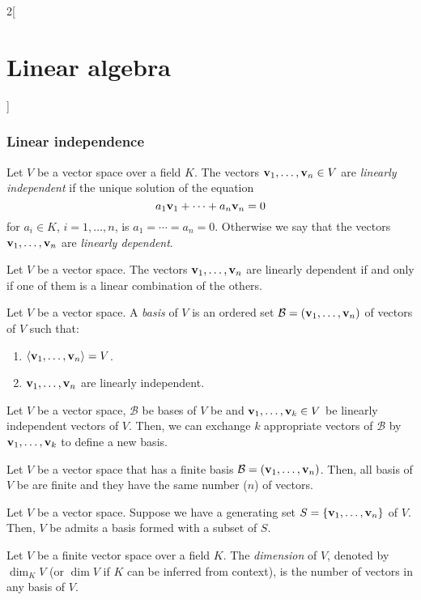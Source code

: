 \documentclass[../../../main_math.tex]{subfiles}
\begin{document}
\begin{multicols}{2}[\section{Linear algebra}]
  \subsubsection{Linear independence}
  \begin{definition}
    Let $V$ be a vector space over a field $K$. The vectors $\boldsymbol{\mathrm{v}}_1,\ldots,\boldsymbol{\mathrm{v}}_n\in V$ are \emph{linearly independent} if the unique solution of the equation $$a_1\boldsymbol{\mathrm{v}}_1+\cdots+a_n\boldsymbol{\mathrm{v}}_n=0$$ for $a_i\in K$, $i=1,\ldots,n$, is $a_1=\cdots=a_n=0$. Otherwise we say that the vectors $\boldsymbol{\mathrm{v}}_1,\ldots,\boldsymbol{\mathrm{v}}_n$ are \emph{linearly dependent}.
  \end{definition}
  \begin{lemma}
    Let $V$ be a vector space. The vectors $\boldsymbol{\mathrm{v}}_1,\ldots,\boldsymbol{\mathrm{v}}_n$ are linearly dependent if and only if one of them is a linear combination of the others.
  \end{lemma}
  \begin{definition}
    Let $V$ be a vector space. A \emph{basis} of $V$ is an ordered set $\mathcal{B}=(\boldsymbol{\mathrm{v}}_1,\ldots,\boldsymbol{\mathrm{v}}_n)$ of vectors of $V$ such that:
    \begin{enumerate}
      \item $\langle \boldsymbol{\mathrm{v}}_1,\ldots,\boldsymbol{\mathrm{v}}_n\rangle = V$.
      \item $\boldsymbol{\mathrm{v}}_1,\ldots,\boldsymbol{\mathrm{v}}_n$ are linearly independent.
    \end{enumerate}
  \end{definition}
  \begin{lemma}
    Let $V$ be a vector space, $\mathcal{B}$ be bases of $V$ be and $\boldsymbol{\mathrm{v}}_1,\ldots,\boldsymbol{\mathrm{v}}_k\in V$ be linearly independent vectors of $V$. Then, we can exchange $k$ appropriate vectors of $\mathcal{B}$ by $\boldsymbol{\mathrm{v}}_1,\ldots,\boldsymbol{\mathrm{v}}_k$ to define a new basis.
  \end{lemma}
  \begin{corollary}
    Let $V$ be a vector space that has a finite basis $\mathcal{B}=(\boldsymbol{\mathrm{v}}_1,\ldots,\boldsymbol{\mathrm{v}}_n)$. Then, all basis of $V$ be are finite and they have the same number ($n$) of vectors.
  \end{corollary}
  \begin{lemma}
    Let $V$ be a vector space. Suppose we have a generating set $S=\{\boldsymbol{\mathrm{v}}_1,\ldots,\boldsymbol{\mathrm{v}}_n\}$ of $V$. Then, $V$ be admits a basis formed with a subset of $S$.
  \end{lemma}
  \begin{definition}
    Let $V$ be a finite vector space over a field $K$. The \emph{dimension} of $V$, denoted by $\dim_K V$ (or $\dim V$ if $K$ can be inferred from context), is the number of vectors in any basis of $V$.

\end{definition}
\end{multicols}
\end{document}
